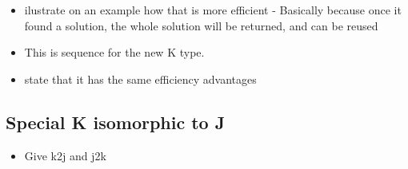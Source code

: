 \documentclass[runningheads]{llncs}
\begin{document}
\begin{itemize}
\item
  ilustrate on an example how that is more efficient - Basically because
  once it found a solution, the whole solution will be returned, and can
  be reused
\item
  This is sequence for the new K type.
\end{itemize}

\begin{Shaded}
\begin{Highlighting}[]
\NormalTok{ [}\NormalTok{ r a] }\OtherTok{{-}\textgreater{}} 
\OtherTok{=}\OtherTok{{-}\textgreater{}}
\OperatorTok{:}\OtherTok{=}\OtherTok{{-}\textgreater{}}\OtherTok{{-}\textgreater{}} \OtherTok{=}\OperatorTok{:}
\end{Highlighting}
\end{Shaded}

\begin{itemize}
\tightlist
\item
  state that it has the same efficiency advantages
\end{itemize}

\subsection{Special K isomorphic to J}\label{special-k-isomorphic-to-j}

\begin{itemize}
\tightlist
\item
  Give k2j and j2k
\end{itemize}

\begin{Shaded}
\begin{Highlighting}[]
 \OtherTok{{-}\textgreater{}} 
\OtherTok{=}\OtherTok{{-}\textgreater{}}
\end{Highlighting}
\end{Shaded}

\begin{Shaded}
\begin{Highlighting}[]
 \OtherTok{{-}\textgreater{}} 
\OtherTok{=}  
\end{Highlighting}
\end{Shaded}
\end{document}

